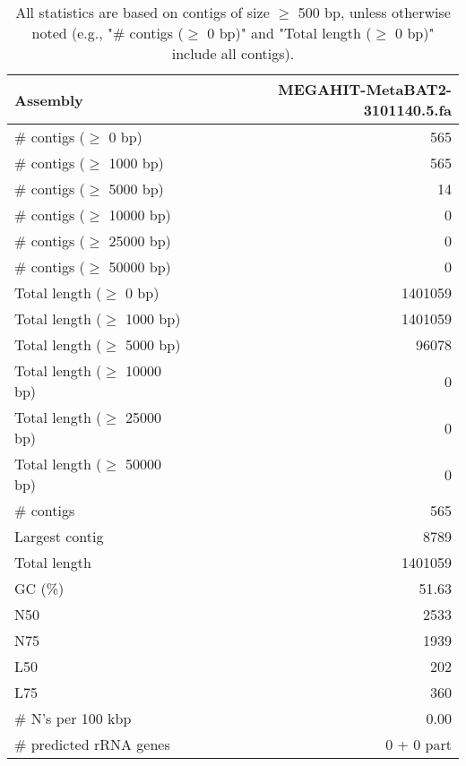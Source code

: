 \documentclass[12pt,a4paper]{article}
\begin{document}
\begin{table}[ht]
\begin{center}
\caption{All statistics are based on contigs of size $\geq$ 500 bp, unless otherwise noted (e.g., "\# contigs ($\geq$ 0 bp)" and "Total length ($\geq$ 0 bp)" include all contigs).}
\begin{tabular}{|l*{1}{|r}|}
\hline
Assembly & MEGAHIT-MetaBAT2-3101140.5.fa \\ \hline
\# contigs ($\geq$ 0 bp) & 565 \\ \hline
\# contigs ($\geq$ 1000 bp) & 565 \\ \hline
\# contigs ($\geq$ 5000 bp) & 14 \\ \hline
\# contigs ($\geq$ 10000 bp) & 0 \\ \hline
\# contigs ($\geq$ 25000 bp) & 0 \\ \hline
\# contigs ($\geq$ 50000 bp) & 0 \\ \hline
Total length ($\geq$ 0 bp) & 1401059 \\ \hline
Total length ($\geq$ 1000 bp) & 1401059 \\ \hline
Total length ($\geq$ 5000 bp) & 96078 \\ \hline
Total length ($\geq$ 10000 bp) & 0 \\ \hline
Total length ($\geq$ 25000 bp) & 0 \\ \hline
Total length ($\geq$ 50000 bp) & 0 \\ \hline
\# contigs & 565 \\ \hline
Largest contig & 8789 \\ \hline
Total length & 1401059 \\ \hline
GC (\%) & 51.63 \\ \hline
N50 & 2533 \\ \hline
N75 & 1939 \\ \hline
L50 & 202 \\ \hline
L75 & 360 \\ \hline
\# N's per 100 kbp & 0.00 \\ \hline
\# predicted rRNA genes & 0 + 0 part \\ \hline
\end{tabular}
\end{center}
\end{table}
\end{document}
